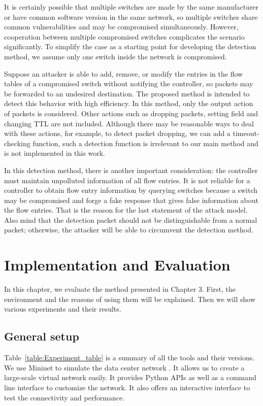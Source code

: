 \documentclass[conference]{IEEEtran}
\begin{document}
It is certainly possible that multiple switches are made by the same manufacturer or have common software version in the same network, so multiple switches share common vulnerabilities and may be compromised simultaneously. However, cooperation between multiple compromised switches complicates the scenario significantly. To simplify the case as a starting point for developing the detection method, we assume only one switch inside the network is compromised.

Suppose an attacker is able to add, remove, or modify the entries in the flow tables of a compromised switch without notifying the controller, so packets may be forwarded to an undesired destination. The proposed method is intended to detect this behavior with high efficiency. In this method, only the output action of packets is considered. Other actions such as dropping packets, setting field and changing TTL are not included. Although there may be reasonable ways to deal with these actions, for example, to detect packet dropping, we can add a timeout-checking function, such a detection function is irrelevant to our main method and is not implemented in this work.

In this detection method, there is another important consideration: the controller must maintain unpolluted information of all flow entries. It is not reliable for a controller to obtain flow entry information by querying switches because a switch may be compromised and forge a fake response that gives false information about the flow entries. That is the reason for the last statement of the attack model. Also mind that the detection packet should not be distinguishable from a normal packet; otherwise, the attacker will be able to circumvent the detection method.

\section{Implementation and Evaluation}
\label{Implementation_and_Evaluation}
In this chapter, we evaluate the method presented in Chapter 3. First, the environment and the reasons of using them will be explained. Then we will show various experiments and their results.

\subsection{General setup}
Table~\ref{table:Experiment_table} is a summary of all the tools and their versions. We use Mininet to simulate the data center network \cite{Mininet}. It allows us to create a large-scale virtual network easily. It provides Python APIs as well as a command line interface to customize the network. It also offers an interactive interface to test the connectivity and performance.
\end{document}
